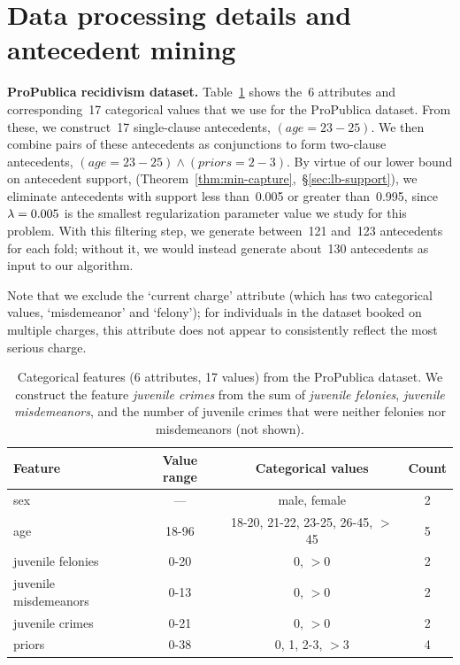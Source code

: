 \section{Data processing details and antecedent mining}
\label{appendix:data}

\textbf{ProPublica recidivism dataset.}
Table~\ref{tab:recidivism-data} shows the~6 attributes
and corresponding~17 categorical values
that we use for the ProPublica dataset.
%
From these, we construct~17 single-clause antecedents, \eg ${(age = 23-25)}$.
%
We then combine pairs of these antecedents as conjunctions to form
two-clause antecedents, \eg ${(age = 23-25) \wedge (priors = 2-3)}$.
%
By virtue of our lower bound on antecedent support,
(Theorem~\ref{thm:min-capture},~\S\ref{sec:lb-support}),
we eliminate antecedents with support less than~0.005 or greater than~0.995,
since ${{\lambda} = 0.005}$ is the smallest regularization parameter value
we study for this problem.
%
With this filtering step, we generate between~121 and~123 antecedents for each fold;
without it, we would instead generate about~130 antecedents as input to our algorithm.

Note that we exclude the `current charge' attribute (which has two categorical values,
`misdemeanor' and `felony'); for individuals in the dataset booked on multiple charges,
this attribute does not appear to consistently reflect the most serious charge.

\begin{table}[h!]
\centering
\begin{tabular}{l  | c  c  c}
Feature & Value range & Categorical values & Count \\
\hline
sex & --- & male, female & 2 \\
age & 18-96 & 18-20, 21-22, 23-25, 26-45, $>$45  & 5 \\
juvenile felonies & 0-20 & 0, $>$0 & 2 \\
juvenile misdemeanors & 0-13 & 0, $>$0 & 2 \\
juvenile crimes & 0-21 & 0, $>$0 & 2 \\
priors & 0-38 & 0, 1, 2-3, $>$3 & 4
\end{tabular}
\caption{Categorical features (6 attributes, 17 values) from the ProPublica dataset.
We construct the feature \emph{juvenile crimes} from the sum of
\emph{juvenile felonies}, \emph{juvenile misdemeanors}, and
the number of juvenile crimes that were neither felonies nor misdemeanors (not shown).
}
\vspace{4mm}
\label{tab:recidivism-data}
\end{table}

